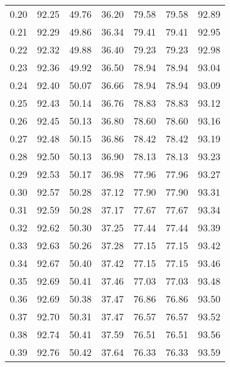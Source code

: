 \begin{tabular}{|c|c|c|c|c|c|c|}
      0.20 &     92.25 &     49.76 &      36.20 &   79.58 &      79.58 &         92.89 \\
      0.21 &     92.29 &     49.86 &      36.34 &   79.41 &      79.41 &         92.95 \\
      0.22 &     92.32 &     49.88 &      36.40 &   79.23 &      79.23 &         92.98 \\
      0.23 &     92.36 &     49.92 &      36.50 &   78.94 &      78.94 &         93.04 \\
      0.24 &     92.40 &     50.07 &      36.66 &   78.94 &      78.94 &         93.09 \\
      0.25 &     92.43 &     50.14 &      36.76 &   78.83 &      78.83 &         93.12 \\
      0.26 &     92.45 &     50.13 &      36.80 &   78.60 &      78.60 &         93.16 \\
      0.27 &     92.48 &     50.15 &      36.86 &   78.42 &      78.42 &         93.19 \\
      0.28 &     92.50 &     50.13 &      36.90 &   78.13 &      78.13 &         93.23 \\
      0.29 &     92.53 &     50.17 &      36.98 &   77.96 &      77.96 &         93.27 \\
      0.30 &     92.57 &     50.28 &      37.12 &   77.90 &      77.90 &         93.31 \\
      0.31 &     92.59 &     50.28 &      37.17 &   77.67 &      77.67 &         93.34 \\
      0.32 &     92.62 &     50.30 &      37.25 &   77.44 &      77.44 &         93.39 \\
      0.33 &     92.63 &     50.26 &      37.28 &   77.15 &      77.15 &         93.42 \\
      0.34 &     92.67 &     50.40 &      37.42 &   77.15 &      77.15 &         93.46 \\
      0.35 &     92.69 &     50.41 &      37.46 &   77.03 &      77.03 &         93.48 \\
      0.36 &     92.69 &     50.38 &      37.47 &   76.86 &      76.86 &         93.50 \\
      0.37 &     92.70 &     50.31 &      37.47 &   76.57 &      76.57 &         93.52 \\
      0.38 &     92.74 &     50.41 &      37.59 &   76.51 &      76.51 &         93.56 \\
      0.39 &     92.76 &     50.42 &      37.64 &   76.33 &      76.33 &         93.59 \\

\end{tabular}
